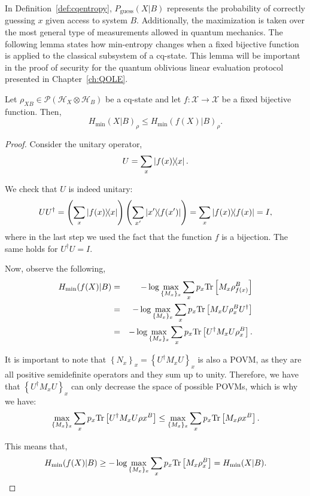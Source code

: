 In Definition~\ref{def:cqentropy}, $P_{\text{guess}}(X|B)$ represents the probability of correctly guessing $x$ given access to system $B$. Additionally, the maximization is taken over the most general type of measurements allowed in quantum mechanics. The following lemma states how min-entropy changes when a fixed bijective function is applied to the classical subsystem of a cq-state. This lemma will be important in the proof of security for the quantum oblivious linear evaluation protocol presented in Chapter~\ref{ch:QOLE}.

\begin{lemma}
Let $\rho_{XB} \in \mathcal{P}(\mathcal{H}_{X}\otimes \mathcal{H}_B)$ be a cq-state and let $f:\mathcal{X} \rightarrow \mathcal{X} $ be a fixed bijective function. Then,
$$H_{\min}(X|B)_{\rho} \leq H_{\min}(f(X)|B)_{\rho}.$$
\label{lemma:bijectivefunction}
\end{lemma}
\begin{proof}
Consider the unitary operator,
$$U = \sum_x \ketbra{f(x)}{x}.$$ 

We check that $U$ is indeed unitary:
\begin{equation*}
U U^{\dagger} = \left(\sum_x \ketbra{f(x)}{x}\right)\left(\sum_{x'} \ketbra{x'}{f(x')}\right) 
= \sum_x \ketbra{f(x)} = I,
\end{equation*}
where in the last step we used the fact that the function $f$ is a bijection. The same holds for $U^{\dagger}U = I$.

Now, observe the following,
\begin{eqnarray*}
H_{\min}(f(X)|B) &=& -\log \max_{\{M_x\}_x} \sum_x p_x \text{Tr}\left[M_x \rho_{f(x)}^B\right]\\
&=& -\log \max_{\{M_x\}_x} \sum_x p_x \text{Tr}\left[M_x U \rho_{x}^B U^{\dagger}\right]\\
&=& -\log \max_{\{M_x\}_x} \sum_x p_x \text{Tr}\left[U^{\dagger} M_x U \rho_{x}^B \right]. 
\end{eqnarray*}

It is important to note that $\left\{ N_x \right\}_x= \left\{U^{\dagger} M_x U\right\}_x$ is also a POVM, as they are all positive semidefinite operators and they sum up to unity. Therefore, we have that $\left\{U^{\dagger} M_x U\right\}_x$ can only decrease the space of possible POVMs, which is why we have:
$$\max_{\{M_x\}_x} \sum_x p_x \text{Tr}\left[U^{\dagger} M_x U \rho{x}^B \right] \leq \max_{\{M_x\}_x} \sum_x p_x \text{Tr}\left[ M_x \rho{x}^B \right].$$

This means that, 
\begin{equation*}
H_{\min}(f(X)|B) \geq -\log \max_{\{M_x\}_x} \sum_x p_x \text{Tr}\left[ M_x \rho_{x}^B \right] = H_{\min}(X|B).
\end{equation*}
\end{proof}

